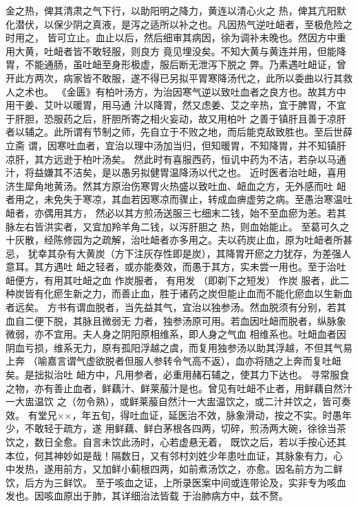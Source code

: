\documentclass[a4paper,12pt,UTF8,twoside]{ctexbook}
\begin{document}
金之热，俾其清肃之气下行，以助阳明之降力，黄连以清心火之 
热，俾其亢阳默化潜伏，以保少阴之真液，是泻之适所以补之也。凡因热气逆吐衄者，至极危险之时用之， 
皆可立止。血止以后，然后细审其病因，徐为调补未晚也。然因方中重用大黄，吐衄者皆不敢轻服，则良方 
竟见埋没矣。不知大黄与黄连并用，但能降胃，不能通肠，虽吐衄至身形极虚，服后断无泄泻下脱之 
弊。乃素遇吐衄证，曾开此方两次，病家皆不敢服，遂不得已另拟平胃寒降汤代之，此所以委曲以行其救 
人之术也。 
《金匮》有柏叶汤方，为治因寒气逆以致吐血者之良方也。故其方中用干姜、艾叶以暖胃，用马通 
汁以降胃，然又虑姜、艾之辛热，宜于脾胃，不宜于肝胆，恐服药之后，肝胆所寄之相火妄动，故又用柏叶 
之善于镇肝且善于凉肝者以辅之。此所谓有节制之师，先自立于不败之地，而后能克敌致胜也。至后世薛立斋 
谓，因寒吐血者，宜治以理中汤加当归，但知暖胃，不知降胃，并不知镇肝凉肝，其方远逊于柏叶汤矣。 
然此时有喜服西药，恒讥中药为不洁，若杂以马通汁，将益嫌其不洁矣，是以愚另拟健胃温降汤以代之也。 
近时医者治吐衄，喜用济生犀角地黄汤。然其方原治伤寒胃火热盛以致吐血、衄血之方，无外感而吐 
衄者用之，未免失于寒凉，其血若因寒凉而骤止，转成血痹虚劳之病。至愚治寒温吐衄者，亦偶用其方， 
然必以其方煎汤送服三七细末二钱，始不至血瘀为恙。若其脉左右皆洪实者，又宜加羚羊角二钱，以泻肝胆之 
热，则血始能止。 
至葛可久之十灰散，经陈修园为之疏解，治吐衄者亦多用之。夫以药炭止血，原为吐衄者所甚忌， 
犹幸其杂有大黄炭（方下注灰存性即是炭），其降胃开瘀之力犹存，为差强人意耳。其方遇吐 
衄之轻者，或亦能奏效，而愚于其方，实未尝一用也。至于治吐衄便方，有用其吐衄之血 作炭服者， 
有用发 （即剃下之短发） 作炭 
服者，此二种炭皆有化瘀生新之力，而善止血，胜于诸药之炭但能止血而不能化瘀血以生新血者远矣。 
方书有谓血脱者，当先益其气，宜治以独参汤。然血脱须有分别，若其血自二便下脱，其脉且微弱无 
力者，独参汤原可用。若血因吐衄而脱者，纵脉象微弱，亦不宜用。夫人身之阴阳原相维系，即人身之气血 
相维系也。吐衄血者因阴血亏损，维系无力，原有孤阳浮越之虞，而复用独参汤以助其浮越，不但其气易上奔 
（喻嘉言谓气虚欲脱者但服人参转令气高不返），血亦将随之上奔而复吐衄矣。是拙拟治吐 
衄方中，凡用参者，必重用赭石辅之，使其力下达也。 
寻常服食之物，亦有善止血者，鲜藕汁、鲜莱菔汁是也。曾见有吐衄不止者，用鲜藕自然汁一大盅温饮 
之（勿令熟），或鲜莱菔自然汁一大盅温饮之，或二汁并饮之，皆可奏效。 
有堂兄××，年五旬，得吐血证，延医治不效，脉象滑动，按之不实。时愚年少，不敢轻于疏方，遂 
用鲜藕、鲜白茅根各四两，切碎，煎汤两大碗，徐徐当茶饮之，数日全愈。自言未饮此汤时，心若虚悬无着， 
既饮之后，若以手按心还其本位，何其神妙如是哉！隔数日，又有邻村刘姓少年患吐血证，其脉象有力，心 
中发热，遂用前方，又加鲜小蓟根四两，如前煮汤饮之，亦愈。因名前方为二鲜饮，后方为三鲜饮。 
至于咳血之证，上所录医案中间或连带论及，实非专为咳血发也。因咳血原出于肺，其详细治法皆载 
于治肺病方中，兹不赘。 
\end{document}
